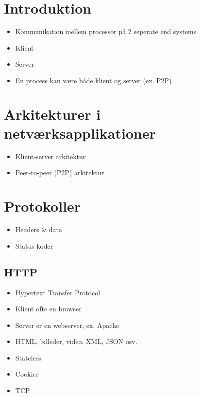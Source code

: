 \section{Introduktion}
\begin{itemize}
	\item Kommunikation mellem processor på 2 seperate end systems
	\item Klient
	\item Server
	\item En process kan være både klient og server (ex. P2P)
\end{itemize}

\section{Arkitekturer i netværksapplikationer}
\begin{itemize}
	\item Klient-server arkitektur
	\item Peer-to-peer (P2P) arkitektur
\end{itemize}

\section{Protokoller}
\begin{itemize}
	\item Headers \& data
	\item Status koder
\end{itemize}

\subsection{HTTP}
\begin{itemize}
	\item Hypertext Transfer Protocol
	\item Klient ofte en browser
	\item Server er en webserver, ex. Apache
	\item HTML, billeder, video, XML, JSON osv.
	\item Stateless
	\item Cookies
	\item TCP
\end{itemize}

